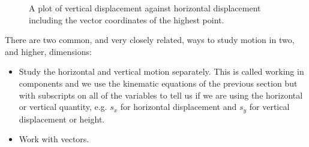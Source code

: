 \begin{figure}[ht]
    \centering
    \caption{A plot of vertical displacement against horizontal displacement including the vector coordinates of the highest point.}
    \label{fig: projectile motion}
\end{figure}


There are two common, and very closely related, ways to study motion in two, and higher, dimensions:
\begin{itemize}
\setlength{\itemsep}{-5pt}
    \item Study the horizontal and vertical motion separately. This is called working in components and we use the kinematic equations of the previous section but with subscripts on all of the variables to tell us if we are using the horizontal or vertical quantity, e.g. $s_{x}$ for horizontal displacement and $s_{y}$ for vertical displacement or height. 
    \item Work with vectors. 
\end{itemize}

